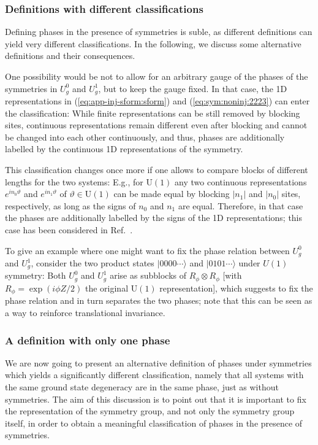 \documentclass[twocolumn,superscriptaddress,prb,linenumbers]{revtex4-1}
\newcommand{\ket}[1]{\vert#1\rangle}
\begin{document}
\subsubsection{Definitions with different classifications}

Defining phases in the presence of symmetries is suble, as different
definitions can yield very different classifications. In the following, we
discuss some alternative definitions and their consequences.

One possibility would be not to allow for an arbitrary gauge of the
phases of the symmetries in $U_g^0$ and $U_g^1$, but to keep the gauge
fixed.  In that case, the 1D representations in
(\ref{eq:app-inj-sform:sform}) and (\ref{eq:sym:noninj:2223}) can enter
the classification: While finite representations can be still removed by
blocking sites, continuous representations remain different even after
blocking and cannot be changed into each other continuously, and thus,
phases are additionally labelled by the continuous 1D representations of
the symmetry.

This classification changes once more if one allows
to compare blocks of different lengths for the two systems: E.g., for
$\mathrm{U}(1)$ any two continuous representations $e^{in_0\vartheta}$ and
$e^{in_1\vartheta}$ of $\vartheta\in \mathrm{U}(1)$ can be made equal by
blocking $|n_1|$ and $|n_0|$ sites, respectively, as long as the signs of
$n_0$ and $n_1$ are equal. Therefore, in that case the phases are
additionally labelled by the signs of the 1D representations; this
case has been considered in Ref.~.

To give an example where one might want to fix the phase relation between
$U_g^0$ and $U_g^1$, consider the two product states $\ket{0000\cdots}$ and
$\ket{0101\cdots}$ under $U(1)$ symmetry: Both $U_g^0$ and $U_g^1$ arise
as subblocks of $R_\phi\otimes R_\phi$ [with $R_\phi=\exp(i
            \phi Z/2)$ the original $\mathrm U(1)$ representation], which suggests to
fix the phase relation and in turn separates the two phases; note that
this can be seen as a way to reinforce translational invariance.


\subsubsection{A definition with only one phase}

We are now going to present an alternative definition of phases under
symmetries which yields a significantly different classification, namely
that all systems with the same ground state degeneracy are in the same
phase, just as without symmetries. The aim of this discussion is to point
out that it is important to fix the representation of the symmetry group,
and not only the symmetry group itself, in order to obtain a meaningful
classification of phases in the presence of symmetries.
\end{document}

